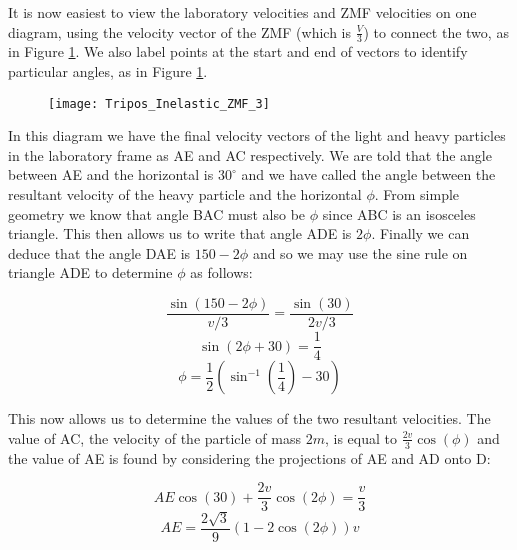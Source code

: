\begin{problem}
{It is now easiest to view the laboratory velocities and ZMF velocities on one diagram, using the velocity vector of the ZMF (which is $\frac{V}{3}$) to connect the two, as in Figure \ref{fig:Tripos_Inelastic_ZMF_3}. We also label points at the start and end of vectors to identify particular angles, as in Figure \ref{fig:Tripos_Inelastic_ZMF_3}. 


\begin{figure}[h]
	\centering
	\texttt{[image: Tripos\_Inelastic\_ZMF\_3]}
	\caption{}
	\label{fig:Tripos_Inelastic_ZMF_3}
\end{figure}

In this diagram we have the final velocity vectors of the light and heavy particles in the laboratory frame as AE and AC respectively. We are told that the angle between AE and the horizontal is $30^\circ$ and we have called the angle between the resultant velocity of the heavy particle and the horizontal $\phi$. From simple geometry we know that angle BAC must also be $\phi$ since ABC is an isosceles triangle. This then allows us to write that angle ADE is $2\phi$. Finally we can deduce that the angle DAE is $150-2\phi$ and so we may use the sine rule on triangle ADE to determine $\phi$ as follows:

\begin{equation*}\frac{\sin{(150-2\phi)}}{v/3}=\frac{\sin{(30)}}{2v/3}\end{equation*}
\begin{equation*}\sin{(2\phi+30)}=\frac{1}{4}\end{equation*}
\begin{equation*}\phi=\frac{1}{2}(\sin^{-1}{(\frac{1}{4})}-30)\end{equation*}

This now allows us to determine the values of the two resultant velocities. The value of AC, the velocity of the particle of mass $2m$, is equal to $\frac{2v}{3}\cos{(\phi)}$ and the value of AE is found by considering the projections of AE and AD onto D:

\begin{equation*}AE\cos{(30)}+\frac{2v}{3}\cos{(2\phi)}=\frac{v}{3}\end{equation*}
\begin{equation*}AE=\frac{2\sqrt{3}}{9}(1-2\cos{(2\phi)})v\end{equation*}

}
\end{problem}